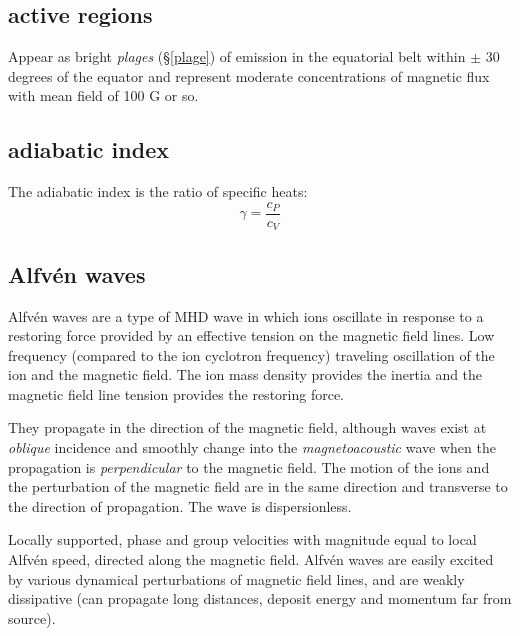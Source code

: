 \documentclass{article}
\begin{document}
\subsection{active regions}
Appear as bright \textit{plages} (\S \ref{plage})
of emission in the equatorial belt within $\pm$
30 degrees of the equator and represent moderate concentrations of magnetic flux
with mean field of 100 G or so.

\subsection{adiabatic index}
The adiabatic index is the ratio of specific heats:
\[
    \gamma = \frac{c_{P}}{c_{V}}
    \]


\subsection{Alfv\'en waves}
Alfv\'en waves are a type of MHD wave in which ions oscillate in response to a
restoring force provided by an effective tension on the magnetic field lines.
Low frequency (compared to the ion cyclotron frequency) traveling
oscillation of the ion and the magnetic field. The ion mass
density provides the inertia and the magnetic field line
tension provides the restoring force.

They propagate in the direction of the magnetic field, although waves exist
at \emph{oblique} incidence and smoothly change into the \emph{magnetoacoustic}
wave when the propagation is \emph{perpendicular} to the magnetic field.
The motion of the ions and the perturbation of the magnetic
field are in the same direction and transverse to the direction of
propagation. The wave is dispersionless.

Locally supported, phase and group velocities with magnitude equal to
local Alfv\'en speed, directed along the magnetic field.
Alfv\'en waves are easily excited by various dynamical perturbations of
magnetic field lines, and are
weakly dissipative (can propagate long distances, deposit energy
and momentum far from source).
\end{document}
